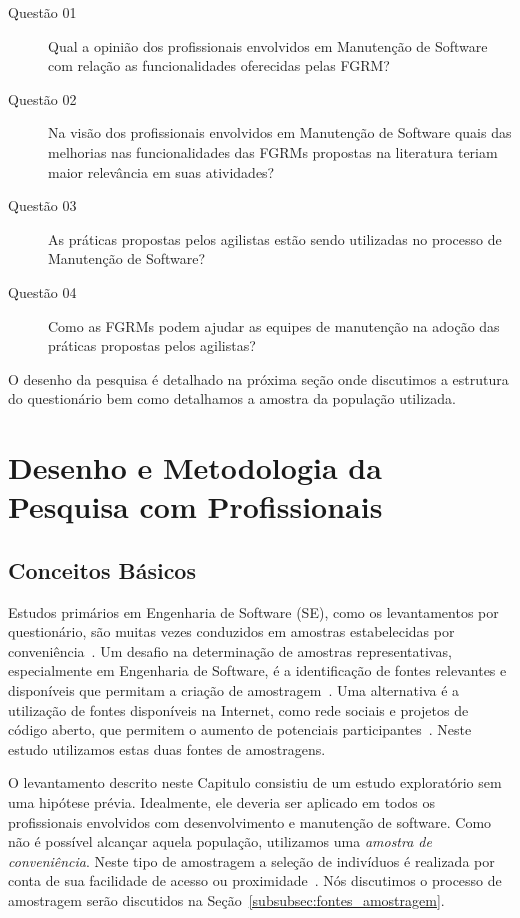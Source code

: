 \begin{description}
	\item[Questão 01] Qual a opinião dos profissionais envolvidos em Manutenção
		de Software com relação as funcionalidades oferecidas pelas
		FGRM\@?
	\item[Questão 02] Na visão dos profissionais envolvidos em Manutenção de
        Software quais das melhorias nas funcionalidades das FGRMs propostas na
        literatura teriam maior relevância em suas atividades?
	\item[Questão 03] As práticas propostas pelos agilistas estão sendo
        utilizadas no processo de Manutenção de Software?
    \item[Questão 04] Como as FGRMs podem ajudar as equipes de manutenção na
        adoção das práticas propostas pelos agilistas?
\end{description}

O desenho da pesquisa é detalhado na próxima seção onde discutimos a estrutura
do questionário bem como detalhamos a amostra da população utilizada.

\section{Desenho e Metodologia da Pesquisa com Profissionais}
\label{sec:desenho_da_pesquisa_com_profissionais}

\subsection{Conceitos Básicos}

Estudos primários em Engenharia de Software (SE), como os levantamentos por
questionário, são muitas vezes conduzidos em amostras estabelecidas por
conveniência~\cite{sjoberg2005survey, dybaa2006systematic}. Um desafio na
determinação de amostras representativas, especialmente em Engenharia de
Software, é a identificação de fontes relevantes e disponíveis que permitam a
criação de amostragem~\cite{de2014towards}. Uma alternativa é a utilização de
fontes disponíveis na Internet, como rede sociais e projetos de código aberto,
que permitem o aumento de potenciais participantes~\cite{de2013would}. Neste
estudo utilizamos estas duas fontes de amostragens.

O levantamento descrito neste Capitulo consistiu de um estudo exploratório sem
uma hipótese prévia. Idealmente, ele deveria ser aplicado em todos os
profissionais envolvidos com desenvolvimento e manutenção de software. Como não
é possível alcançar aquela população, utilizamos uma \textit{amostra de
    conveniência}. Neste tipo de amostragem a seleção de indivíduos é realizada
por conta de sua facilidade de acesso ou
proximidade~\cite{marshall1996sampling}. Nós discutimos o processo de amostragem
serão discutidos na Seção~\ref{subsubsec:fontes_amostragem}.

